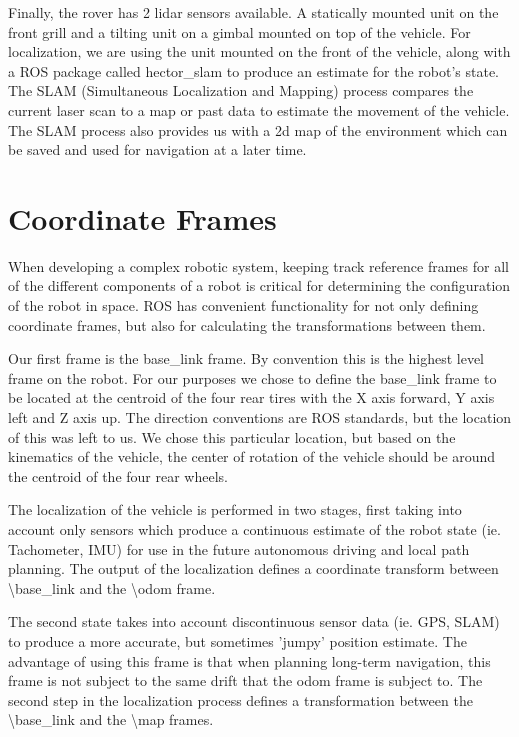Finally, the rover has 2 lidar sensors available. A statically mounted unit on the front grill and a tilting unit on a gimbal mounted on top of the vehicle. For localization, we are using the unit mounted on the front of the vehicle, along with a ROS package called hector\_slam to produce an estimate for the robot's state. The SLAM (Simultaneous Localization and Mapping) process compares the current laser scan to a map or past data to estimate the movement of the vehicle. The SLAM process also provides us with a 2d map of the environment which can be saved and used for navigation at a later time.

\section{Coordinate Frames}

When developing a complex robotic system, keeping track reference frames for all of the different components of a robot is critical for determining the configuration of the robot in space. ROS has convenient functionality for not only defining coordinate frames, but also for calculating the transformations between them. 

Our first frame is the base\_link frame. By convention this is the highest level frame on the robot. For our purposes we chose to define the base\_link frame to be located at the centroid of the four rear tires with the X axis forward, Y axis left and Z axis up. The direction conventions are ROS standards, but the location of this was left to us. We chose this particular location, but based on the kinematics of the vehicle, the center of rotation of the vehicle should be around the centroid of the four rear wheels. 

The localization of the vehicle is performed in two stages, first taking into account only sensors which produce a continuous estimate of the robot state (ie. Tachometer, IMU) for use in the future autonomous driving and local path planning. The output of the localization defines a coordinate transform between \textbackslash base\_link and the \textbackslash odom frame.

The second state takes into account discontinuous sensor data (ie. GPS, SLAM) to produce a more accurate, but sometimes 'jumpy' position estimate. The advantage of using this frame is that when planning long-term navigation, this frame is not subject to the same drift that the odom frame is subject to. The second step in the localization process defines a transformation between the \textbackslash base\_link and the \textbackslash map frames.

